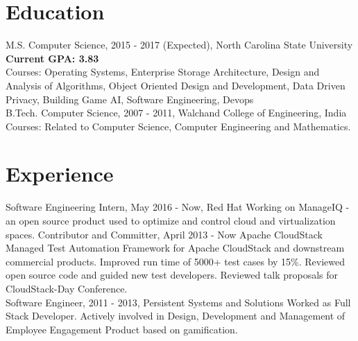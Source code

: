 \documentclass[]{friggeri-cv}
\begin{document}
\section{Education}
\vspace{0.8mm}
\begin{entrylist}
  \entry
    {M.S. Computer Science, 2015 - 2017 (Expected),}
    {North Carolina State University}
    {\textbf{Current GPA: 3.83}\\Courses: Operating Systems, Enterprise Storage Architecture, Design and Analysis of Algorithms, Object Oriented Design and Development, Data Driven Privacy, Building Game AI, Software Engineering, Devops\\}
  \entry
    {B.Tech. Computer Science, 2007 - 2011,}
    {Walchand College of Engineering, India}
    {Courses: Related to Computer Science, Computer Engineering and Mathematics.\\}
\end{entrylist}
\section{Experience}
\begin{entrylist}
  \entry
    {Software Engineering Intern, May 2016 - Now,}
    {Red Hat}
    {Working on ManageIQ - an open source product used to optimize and control cloud and virtualization spaces.\newline}
  \entry
    {Contributor and Committer, April 2013 - Now}
    {Apache CloudStack}
    {Managed Test Automation Framework for Apache CloudStack and downstream commercial products. Improved run time of 5000+ test cases by 15\%. Reviewed open source code and guided new test developers. Reviewed talk proposals for CloudStack-Day Conference.\\}
    \entry
    {Software Engineer, 2011 - 2013,}
    {Persistent Systems and Solutions}
    {Worked as Full Stack Developer. Actively involved in Design, Development and Management of Employee Engagement Product based on gamification.\\}
\end{entrylist}
\end{document}
